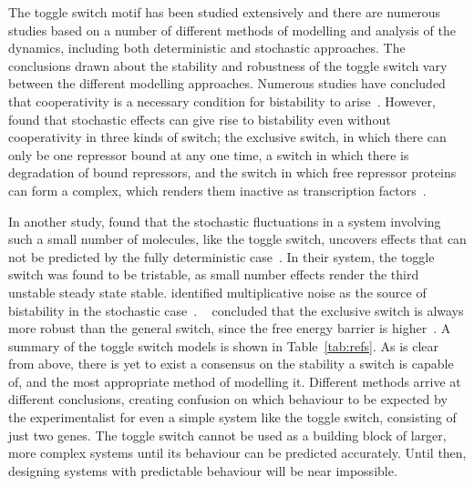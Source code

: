 The toggle switch motif has been studied extensively and there are numerous studies based on a number of different methods of modelling and analysis of the dynamics, including both deterministic and stochastic approaches. The conclusions drawn about the stability and robustness of the toggle switch vary between the different modelling approaches. Numerous studies have concluded that cooperativity is a necessary condition for bistability to arise~\autocite{Gardner:2000vha, Walczak:2005ds, Warren:2004baa, Warren:2005kea, Cherry:2000wi}. However, ~\textcite{Lipshtat:2006wb} found that stochastic effects can give rise to bistability even without cooperativity in three kinds of switch; the exclusive switch, in which there can only be one repressor bound at any one time, a switch in which there is degradation of bound repressors, and the switch in which free repressor proteins can form a complex, which renders them inactive as transcription factors~\autocite{Lipshtat:2006wb}. 

In another study, \textcite{Ma:2012dt} found that the stochastic fluctuations in a system involving such a small number of molecules, like the toggle switch, uncovers effects that can not be predicted by the fully deterministic case~\autocite{Ma:2012dt}. In their system, the toggle switch was found to be tristable, as small number effects render the third unstable steady state stable. \textcite{Biancalani:2015vya} identified multiplicative noise as the source of bistability in the stochastic case~\autocite{Biancalani:2015vya}. ~\textcite{Warren:2005kea} concluded that the exclusive switch is always more robust than the general switch, since the free energy barrier is higher~\autocite{Warren:2005kea}. A summary of the toggle switch models is shown in Table~\ref{tab:refs}. As is clear from above, there is yet to exist a consensus on the stability a switch is capable of, and the most appropriate method of modelling it. Different methods arrive at different conclusions, creating confusion on which behaviour to be expected by the experimentalist for even a simple system like the toggle switch, consisting of just two genes. The toggle switch cannot be used as a building block of larger, more complex systems until its behaviour can be predicted accurately. Until then, designing systems with predictable behaviour will be near impossible.


